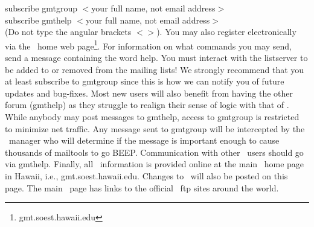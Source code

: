 \vspace{\baselineskip} 

subscribe gmtgroup $<$your full name, not email address$>$ \\

subscribe gmthelp $<$your full name, not email address$>$ \\

(Do not type the angular brackets $<$$>$).  You may also
register electronically via the \GMT\ home web
page\footnote{gmt.soest.hawaii.edu}.  For information
on what commands you may send, send a message containing
the word help.  You must interact with the listserver to be
added to or removed from the mailing lists!  We strongly recommend that you
at least subscribe to gmtgroup since this is how we can notify
you of future updates and bug-fixes.  Most new users will
also benefit from having the other forum (gmthelp) as they
struggle to realign their sense of logic with that of \GMT.
While anybody may post messages to gmthelp, access to gmtgroup
is restricted to minimize net traffic.  Any message sent to
gmtgroup will be intercepted by the \GMT\ manager who will
determine if the message is important enough to cause thousands
of mailtools to go BEEP.  Communication with other \GMT\ users
should go via gmthelp.  Finally, all \GMT\ information is provided
online at the main \GMT\ home page in Hawaii, i.e.,
gmt.soest.hawaii.edu.  Changes to \GMT\ will also be posted
on this page.  The main \GMT\ page has links to the official
\GMT\ ftp sites around the world.
